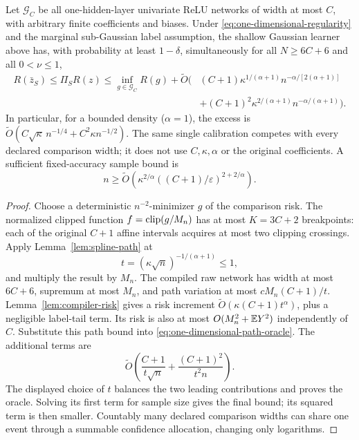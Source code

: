 \begin{theorem}
\label{thm:univariate-Gaussian}
Let $\mathcal G_C$ be all one-hidden-layer univariate ReLU networks of
width at most $C$, with arbitrary finite coefficients and biases.
Under \eqref{eq:one-dimensional-regularity} and the marginal
sub-Gaussian label assumption, the shallow Gaussian learner above
has, with probability at least $1-\delta$, simultaneously for all
$N\ge6C+6$ and all $0<\nu\le1$,
\begin{align*}
 R(\bar z_S)\le\Pi_SR(z)
 \le\inf_{g\in\mathcal G_C}R(g)+\widetilde O\bigl(
 &(C+1)\kappa^{1/(\alpha+1)}n^{-\alpha/[2(\alpha+1)]}\\
 &+(C+1)^2\kappa^{2/(\alpha+1)}n^{-\alpha/(\alpha+1)}\bigr).
\end{align*}
In particular, for a bounded density ($\alpha=1$), the excess is
$\widetilde O(C\sqrt\kappa\,n^{-1/4}+C^2\kappa n^{-1/2})$.
The same single calibration competes with every declared comparison
width; it does not use $C,\kappa,\alpha$ or the original coefficients.
A sufficient fixed-accuracy sample bound is
\[
 n\ge\widetilde O\left(
 \kappa^{2/\alpha}
       ((C+1)/\varepsilon)^{2+2/\alpha}\right).
\]
\end{theorem}
\begin{proof}
Choose a deterministic $n^{-2}$-minimizer $g$ of the comparison risk.
The normalized clipped function
$f=\operatorname{clip}(g/M_n)$ has at most $K=3C+2$ breakpoints: each of the
original $C+1$ affine intervals acquires at most two clipping crossings.
Apply Lemma~\ref{lem:spline-path} at
\[
 t=(\kappa\sqrt n)^{-1/(\alpha+1)}\le1,
\]
and multiply the result by $M_n$. The compiled raw network has width
at most $6C+6$, supremum at most $M_n$, and path variation at most
$cM_n(C+1)/t$. Lemma~\ref{lem:compiler-risk} gives a risk increment
$\widetilde O(\kappa(C+1)t^\alpha)$, plus a negligible label-tail term.
Its risk is also at most $O(M_n^2+\mathbb E Y^2)$ independently of $C$.
Substitute this path bound into
\eqref{eq:one-dimensional-path-oracle}. The additional terms are
\[
 \widetilde O\left(\frac{C+1}{t\sqrt n}
                         +\frac{(C+1)^2}{t^2n}\right).
\]
The displayed choice of $t$ balances the two leading contributions
and proves the oracle. Solving its first term for sample size gives
the final bound; its squared term is then smaller. Countably many
declared comparison widths can share one event through a summable
confidence allocation, changing only logarithms.
\end{proof}
